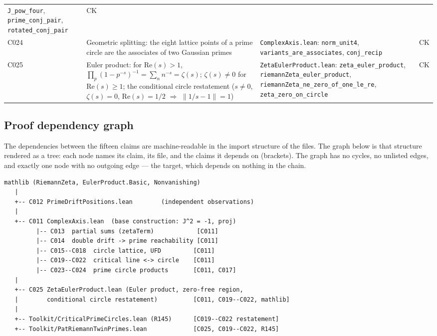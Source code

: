 \documentclass[sigplan,10pt,anonymous,review]{acmart}
\begin{document}
\begin{center}
\begin{tabular}{@{}p{1.5cm}p{5.4cm}p{5.4cm}p{0.8cm}@{}}
\texttt{J\_pow\_four}, \texttt{prime\_conj\_pair},
\texttt{rotated\_conj\_pair} & \textcolor{classical}{CK} \\
C024 & Geometric splitting: the eight lattice points of a prime circle
are the associates of two Gaussian primes & \texttt{ComplexAxis.lean}:
\texttt{norm\_unit4}, \texttt{variants\_are\_associates},
\texttt{conj\_recip} & \textcolor{classical}{CK} \\
C025 & Euler product: for $\mathrm{Re}(s) > 1$, $\prod_p (1 -
p^{-s})^{-1} = \sum_n n^{-s} = \zeta(s)$; $\zeta(s) \ne 0$ for
$\mathrm{Re}(s) \ge 1$; the conditional circle restatement
($s \ne 0$, $\zeta(s)=0$, $\mathrm{Re}(s)=1/2$ $\Rightarrow$
$\|1/s - 1\| = 1$) & \texttt{ZetaEulerProduct.lean}:
\texttt{zeta\_euler\_product}, \texttt{riemannZeta\_euler\_product},
\texttt{riemannZeta\_ne\_zero\_of\_one\_le\_re},
\texttt{zeta\_zero\_on\_circle} & \textcolor{classical}{CK} \\
\bottomrule
\end{tabular}
\end{center}

\subsection{Proof dependency graph}\label{sec:map-graph}

The dependencies between the fifteen claims are machine-readable in the
import structure of the files. The graph below is that structure rendered
as a tree: each node names its claim, its file, and the claims it
depends on (brackets). The graph has no cycles, no unlisted edges, and
exactly one node with no outgoing edge --- the target, which depends on
nothing in the chain.

\begin{lstlisting}[basicstyle=\ttfamily\scriptsize]
mathlib (RiemannZeta, EulerProduct.Basic, Nonvanishing)
   |
   +-- C012 PrimeDriftPositions.lean        (independent observations)
   |
   +-- C011 ComplexAxis.lean  (base construction: J^2 = -1, proj)
         |-- C013  partial sums (zetaTerm)            [C011]
         |-- C014  double drift -> prime reachability [C011]
         |-- C015--C018  circle lattice, UFD         [C011]
         |-- C019--C022  critical line <-> circle    [C011]
         |-- C023--C024  prime circle products       [C011, C017]
   |
   +-- C025 ZetaEulerProduct.lean (Euler product, zero-free region,
   |        conditional circle restatement)          [C011, C019--C022, mathlib]
   |
   +-- Toolkit/CriticalPrimeCircles.lean (R145)      [C019--C022 restatement]
   +-- Toolkit/PatRiemannTwinPrimes.lean             [C025, C019--C022, R145]
\end{lstlisting}
\end{document}
